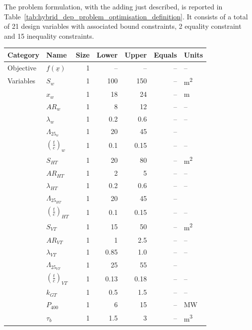 The problem formulation, with the adding just described, is reported in Table~\ref{tab:hybrid_dep_problem_optimisation_definition}. 
It consists of a total of 21 design variables with associated bound constraints, 2 equality constraint and 15 inequality constraints. 
\begin{table}[h!]
	\centering
	\begin{tabular}{l l r r r r l}
		\hline
		\textbf{Category} & \textbf{Name} & \textbf{Size} & \textbf{Lower} & \textbf{Upper} & \textbf{Equals} & \textbf{Units} \\
		\hline
		Objective & $f\left(\underline{x}\right)$ & 1 & -- & -- & -- & -- \\
		\hline
		Variables & $S_w$ & 1 & \num{100} & \num{150} & -- & \si{\square\meter} \\
		& $x_w$ & 1 & \num{18} & \num{24} & -- & \si{\meter} \\
		& $AR_{w}$ & 1 & \num{8} & \num{12} & -- & -- \\
		& $\lambda_{w}$ & 1 & \num{0.2} & \num{0.6} & -- & -- \\
		& $\Lambda_{25_{w}}$ & 1 & \num{20} & \num{45} & -- & \si{\deg} \\
		& $\left(\frac{t}{c}\right)_w$ & 1 & \num{0.1} & \num{0.15} & -- & -- \\
		& $S_{HT}$ & 1 & \num{20} & \num{80} & -- & \si{\square\meter} \\
		& $AR_{HT}$ & 1 & \num{2} & \num{5} & -- & -- \\
		& $\lambda_{HT}$ & 1 & \num{0.2} & \num{0.6} & -- & -- \\
		& $\Lambda_{25_{HT}}$ & 1 & \num{20} & \num{45} & -- & \si{\deg} \\
		& $\left(\frac{t}{c}\right)_{HT}$ & 1 & \num{0.1} & \num{0.15} & -- & -- \\
		& $S_{VT}$ & 1 & \num{15} & \num{50} & -- & \si{\square\meter} \\
		& $AR_{VT}$ & 1 & \num{1} & \num{2.5} & -- & -- \\
		& $\lambda_{VT}$ & 1 & \num{0.85} & \num{1.0} & -- & -- \\
		& $\Lambda_{25_{VT}}$ & 1 & \num{25} & \num{55} & -- & \si{\deg} \\
		& $\left(\frac{t}{c}\right)_{VT}$ & 1 & \num{0.13} & \num{0.18} & -- & -- \\
		& $k_{GT}$ & 1 & \num{0.5} & \num{1.5} & -- & -- \\
		& $P_{400}$ & 1 & \num{6} & \num{15} & -- & \si{\mega\watt} \\
		& $\tau_{b}$ & 1 & \num{1.5} & \num{3} & -- & \si{\cubic\meter} \\

\end{tabular}
\end{table}
